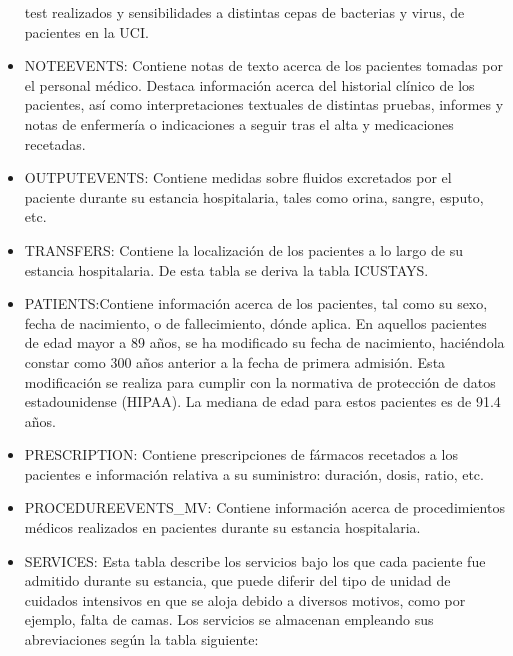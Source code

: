 \documentclass{report}
\begin{document}
\begin{itemize}
  test realizados y sensibilidades a distintas cepas de bacterias y
  virus, de pacientes en la UCI. 
\item
  NOTEEVENTS: Contiene notas de texto acerca de los pacientes tomadas
  por el personal médico. Destaca información acerca del historial
  clínico de los pacientes, así como interpretaciones textuales de
  distintas pruebas, informes y notas de enfermería o indicaciones a
  seguir tras el alta y medicaciones recetadas. 
\item
  OUTPUTEVENTS: Contiene medidas sobre fluidos excretados por el
  paciente durante su estancia hospitalaria, tales como orina, sangre,
  esputo, etc. 
\item
  TRANSFERS: Contiene la localización de los pacientes a lo largo de su
  estancia hospitalaria. De esta tabla se deriva la tabla ICUSTAYS. 
\item
  PATIENTS:Contiene información acerca de los pacientes, tal como su
  sexo, fecha de nacimiento, o de fallecimiento, dónde aplica. En
  aquellos pacientes de edad mayor a 89 años, se ha modificado su fecha
  de nacimiento, haciéndola constar como 300 años anterior a la fecha de
  primera admisión. Esta modificación se realiza para cumplir con la
  normativa de protección de datos estadounidense (HIPAA). La mediana de
  edad para estos pacientes es de 91.4 años. 
\item
  PRESCRIPTION: Contiene prescripciones de fármacos recetados a los
  pacientes e información relativa a su suministro: duración, dosis,
  ratio, etc.
\item
  PROCEDUREEVENTS\_MV: Contiene información acerca de procedimientos
  médicos realizados en pacientes durante su estancia hospitalaria.
\item
  SERVICES: Esta tabla describe los servicios bajo los que cada paciente
  fue admitido durante su estancia, que puede diferir del tipo de unidad
  de cuidados intensivos en que se aloja debido a diversos motivos, como
  por ejemplo, falta de camas. Los servicios se almacenan empleando sus
  abreviaciones según la tabla siguiente:
\end{itemize}
\end{document}
